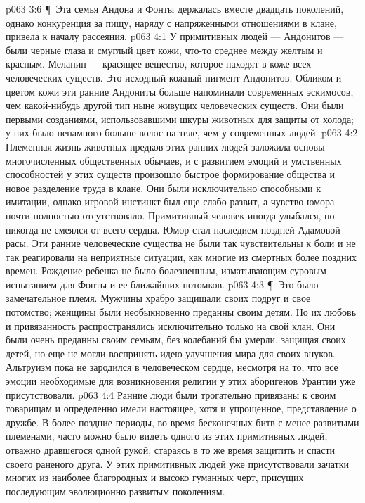 \vs p063 3:6 \P\ Эта семья Андона и Фонты держалась вместе двадцать поколений, однако конкуренция за пищу, наряду с напряженными отношениями в клане, привела к началу рассеяния.
\vs p063 4:1 У примитивных людей --- Андонитов --- были черные глаза и смуглый цвет кожи, что\hyp{}то среднее между желтым и красным. Меланин --- красящее вещество, которое находят в коже всех человеческих существ. Это исходный кожный пигмент Андонитов. Обликом и цветом кожи эти ранние Андониты больше напоминали современных эскимосов, чем какой\hyp{}нибудь другой тип ныне живущих человеческих существ. Они были первыми созданиями, использовавшими шкуры животных для защиты от холода; у них было ненамного больше волос на теле, чем у современных людей.
\vs p063 4:2 Племенная жизнь животных предков этих ранних людей заложила основы многочисленных общественных обычаев, и с развитием эмоций и умственных способностей у этих существ произошло быстрое формирование общества и новое разделение труда в клане. Они были исключительно способными к имитации, однако игровой инстинкт был еще слабо развит, а чувство юмора почти полностью отсутствовало. Примитивный человек иногда улыбался, но никогда не смеялся от всего сердца. Юмор стал наследием поздней Адамовой расы. Эти ранние человеческие существа не были так чувствительны к боли и не так реагировали на неприятные ситуации, как многие из смертных более поздних времен. Рождение ребенка не было болезненным, изматывающим суровым испытанием для Фонты и ее ближайших потомков.
\vs p063 4:3 \P\ Это было замечательное племя. Мужчины храбро защищали своих подруг и свое потомство; женщины были необыкновенно преданны своим детям. Но их любовь и привязанность распространялись исключительно только на свой клан. Они были очень преданны своим семьям, без колебаний бы умерли, защищая своих детей, но еще не могли воспринять идею улучшения мира для своих внуков. Альтруизм пока не зародился в человеческом сердце, несмотря на то, что все эмоции необходимые для возникновения религии у этих аборигенов Урантии уже присутствовали.
\vs p063 4:4 Ранние люди были трогательно привязаны к своим товарищам и определенно имели настоящее, хотя и упрощенное, представление о дружбе. В более поздние периоды, во время бесконечных битв с менее развитыми племенами, часто можно было видеть одного из этих примитивных людей, отважно дравшегося одной рукой, стараясь в то же время защитить и спасти своего раненого друга. У этих примитивных людей уже присутствовали зачатки многих из наиболее благородных и высоко гуманных черт, присущих последующим эволюционно развитым поколениям.
